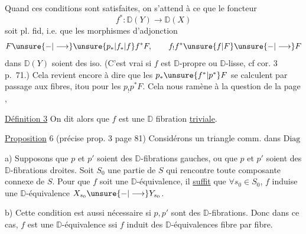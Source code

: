 
Quand ces conditions sont satisfaites, on s'attend à ce que le foncteur
\[
f^*:\mathbb D(Y)\longrightarrow\mathbb D(X)
\]
soit pl. fid, i.e. que les morphismes d'adjonction
\[
F\unsure{-|\longrightarrow} \unsure{p_*|f_*|f} f^*F,\qquad f_! f^*\unsure{f|F}\unsure{-|\longrightarrow} F
\]
dans $\mathbb D(Y)$ soient des iso. (C'est vrai si $f$ est $\mathbb D$-propre ou $\mathbb D$-lisse, cf cor. 3 p.~71.) Cela revient encore à dire que les $p_*\unsure{f^*|p^*}F$ se calculent par passage aux fibres,   itou pour les $p_!p^*F$. Cela nous ramène à la question de la page ,

\uline{Définition 3} On dit alors que $f$ est une $\mathbb D$ fibration \uline{triviale}.

\uline{Proposition} 6 (précise prop. 3 page 81) Considérons un triangle comm. dans $\mathrm{Diag}$

a)  Supposons que $p$ et $p'$ soient des $\mathbb D$-fibrations gauches, ou que $p$ et $p'$ soient des $\mathbb D$-fibrations droites. Soit  $S_0$ une partie de $S$ qui rencontre toute composante connexe de $S$. Pour que $f$ soit une $\mathbb D$-équivalence, il \uline{suffit} que $\forall s_0\in S_0$, $f$ induise une $\mathbb D$-équivalence $X_{s_0}\unsure{-|\longrightarrow} Y_{s_0}$.


b) Cette condition est aussi nécessaire  si $p,p'$ sont des $\mathbb D$-fibrations. Donc dans ce cas, $f$ est une $\mathbb D$-équivalence ssi $f$ induit des $\mathbb D$-équivalences fibre par fibre.


